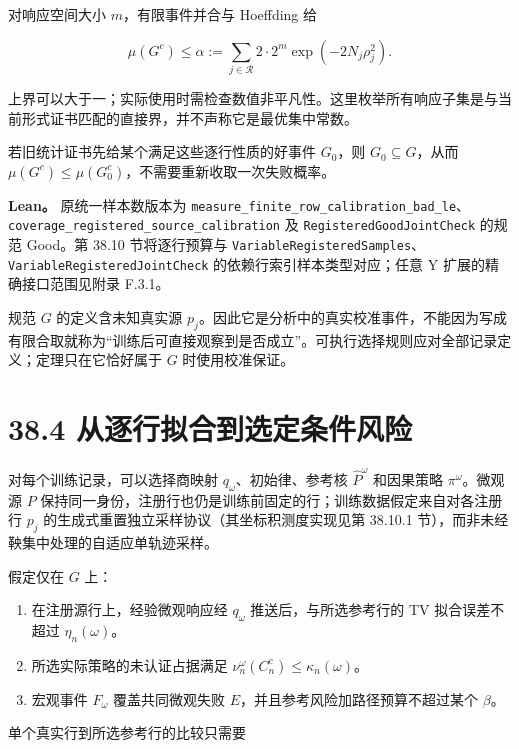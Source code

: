 \documentclass[
  11pt,
  oneside]{book}
\providecommand{\tightlist}{%
  \setlength{\itemsep}{0pt}\setlength{\parskip}{0pt}}
\begin{document}
对响应空间大小 \(m\)，有限事件并合与 Hoeffding 给

\[\mu(G^c)\le
\alpha:=\sum_{j\in\mathcal R}
2\cdot2^m\exp(-2N_j\rho_j^2).\]

上界可以大于一；实际使用时需检查数值非平凡性。这里枚举所有响应子集是与当前形式证书匹配的直接界，并不声称它是最优集中常数。

若旧统计证书先给某个满足这些逐行性质的好事件 \(G_0\)，则 \(G_0\subseteq G\)，从而 \(\mu(G^c)\le\mu(G_0^c)\)，不需要重新收取一次失败概率。

\textbf{Lean。} 原统一样本数版本为 \nolinkurl{measure_finite_row_calibration_bad_le}、\nolinkurl{coverage_registered_source_calibration} 及 \nolinkurl{RegisteredGoodJointCheck} 的规范 Good。第 38.10 节将逐行预算与 \nolinkurl{VariableRegisteredSamples}、\nolinkurl{VariableRegisteredJointCheck} 的依赖行索引样本类型对应；任意 Y 扩展的精确接口范围见附录 F.3.1。

规范 \(G\) 的定义含未知真实源 \(p_j\)。因此它是分析中的真实校准事件，不能因为写成有限合取就称为``训练后可直接观察到是否成立''。可执行选择规则应对全部记录定义；定理只在它恰好属于 \(G\) 时使用校准保证。

\section{38.4 从逐行拟合到选定条件风险}\label{ux4eceux9010ux884cux62dfux5408ux5230ux9009ux5b9aux6761ux4ef6ux98ceux9669}

对每个训练记录，可以选择商映射 \(q_\omega\)、初始律、参考核 \(\widehat P^\omega\) 和因果策略 \(\pi^\omega\)。微观源 \(P\) 保持同一身份，注册行也仍是训练前固定的行；训练数据假定来自对各注册行 \(p_j\) 的生成式重置独立采样协议（其坐标积测度实现见第 38.10.1 节），而非未经鞅集中处理的自适应单轨迹采样。

假定仅在 \(G\) 上：

\begin{enumerate}
\def\labelenumi{\arabic{enumi}.}
\tightlist
\item
  在注册源行上，经验微观响应经 \(q_\omega\) 推送后，与所选参考行的 TV 拟合误差不超过 \(\eta_n(\omega)\)。
\item
  所选实际策略的未认证占据满足 \(\nu_n^\omega(C_n^c)\le\kappa_n(\omega)\)。
\item
  宏观事件 \(F_\omega\) 覆盖共同微观失败 \(E\)，并且参考风险加路径预算不超过某个 \(\beta\)。
\end{enumerate}

单个真实行到所选参考行的比较只需要
\end{document}
